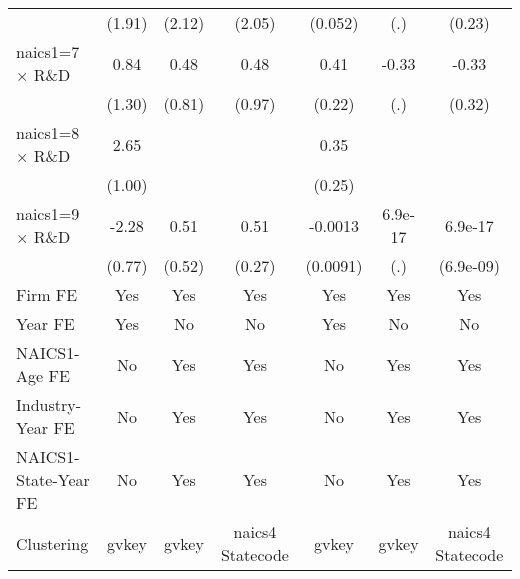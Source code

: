 {\begin{tabular}{l*{6}{c}}
                    &      (1.91)         &      (2.12)         &      (2.05)         &     (0.052)         &         (.)         &      (0.23)         \\
\addlinespace
naics1=7 $\times$ R\&D&        0.84         &        0.48         &        0.48         &        0.41\sym{*}  &       -0.33         &       -0.33         \\
                    &      (1.30)         &      (0.81)         &      (0.97)         &      (0.22)         &         (.)         &      (0.32)         \\
\addlinespace
naics1=8 $\times$ R\&D&        2.65\sym{***}&                     &                     &        0.35         &                     &                     \\
                    &      (1.00)         &                     &                     &      (0.25)         &                     &                     \\
\addlinespace
naics1=9 $\times$ R\&D&       -2.28\sym{***}&        0.51         &        0.51\sym{*}  &     -0.0013         &     6.9e-17         &     6.9e-17         \\
                    &      (0.77)         &      (0.52)         &      (0.27)         &    (0.0091)         &         (.)         &   (6.9e-09)         \\
\addlinespace
Firm FE             &         Yes         &         Yes         &         Yes         &         Yes         &         Yes         &         Yes         \\
\addlinespace
Year FE             &         Yes         &          No         &          No         &         Yes         &          No         &          No         \\
\addlinespace
NAICS1-Age FE       &          No         &         Yes         &         Yes         &          No         &         Yes         &         Yes         \\
\addlinespace
Industry-Year FE    &          No         &         Yes         &         Yes         &          No         &         Yes         &         Yes         \\
\addlinespace
NAICS1-State-Year FE&          No         &         Yes         &         Yes         &          No         &         Yes         &         Yes         \\
\midrule
Clustering          &       gvkey         &       gvkey         &naics4 Statecode         &       gvkey         &       gvkey         &naics4 Statecode         \\

\end{tabular}}
